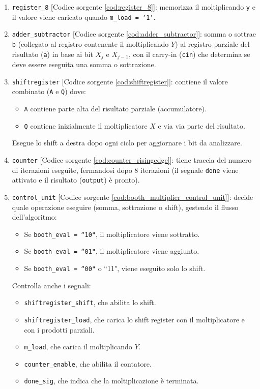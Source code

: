 \begin{enumerate}
    \item \texttt{register\_8} [Codice sorgente \ref{cod:register_8}]: memorizza il moltiplicando \texttt{y} e il valore viene caricato quando \texttt{m\_load = `1'}.
    \item \texttt{adder\_subtractor} [Codice sorgente \ref{cod:adder_subtractor}]: somma o sottrae \texttt{b} (collegato al registro contenente il moltiplicando $Y$) al registro parziale del risultato (\texttt{a}) in base ai bit $X_j$ e $X_{j-1}$, con il carry-in (\texttt{cin}) che determina se deve essere eseguita una somma o sottrazione.
    \item \texttt{shiftregister} [Codice sorgente \ref{cod:shiftregister}]: contiene il valore combinato (\texttt{A} e \texttt{Q}) dove:
    \begin{itemize}
        \item \texttt{A} contiene parte alta del risultato parziale (accumulatore).
        \item \texttt{Q} contiene inizialmente il moltiplicatore $X$ e via via parte del risultato.
    \end{itemize}
    Esegue lo shift a destra dopo ogni ciclo per aggiornare i bit da analizzare.
    \item \texttt{counter} [Codice sorgente \ref{cod:counter_risingedge}]: tiene traccia del numero di iterazioni eseguite, fermandosi dopo 8 iterazioni (il segnale \texttt{done} viene attivato e il risultato (\texttt{output}) è pronto).
    \item \texttt{control\_unit} [Codice sorgente \ref{cod:booth_multiplier_control_unit}]: decide quale operazione eseguire (somma, sottrazione o shift), gestendo il flusso dell'algoritmo:
    \begin{itemize}
        \item Se \texttt{booth\_eval = ``10"}, il moltiplicatore viene sottratto.
        \item Se \texttt{booth\_eval = ``01"}, il moltiplicatore viene aggiunto.
        \item Se \texttt{booth\_eval = ``00"} o ``11", viene eseguito solo lo shift.
    \end{itemize}
    Controlla anche i segnali:
    \begin{itemize}
        \item \texttt{shiftregister\_shift}, che abilita lo shift.
        \item \texttt{shiftregister\_load}, che carica lo shift register con il moltiplicatore e con i prodotti parziali.
        \item \texttt{m\_load}, che carica il moltiplicando $Y$.
        \item \texttt{counter\_enable}, che abilita il contatore.
        \item \texttt{done\_sig}, che indica che la moltiplicazione è terminata.
    \end{itemize}
\end{enumerate}

